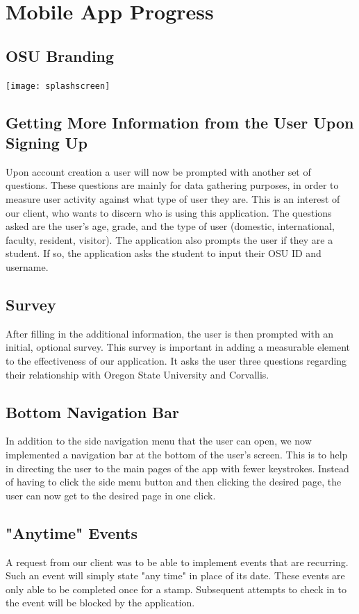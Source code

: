 \documentclass[onecolumn, draftclsnofoot,10pt, compsoc]{IEEEtran}
\begin{document}
\section{Mobile App Progress}
  \subsection{OSU Branding}
    \texttt{[image: splashscreen]}

  \subsection{Getting More Information from the User Upon Signing Up}
  Upon account creation a user will now be prompted with another set of questions. These questions are mainly for data gathering purposes,
  in order to measure user activity against what type of user they are. This is an interest of our client, who wants to discern who is using this application.
  The questions asked are the user's age, grade, and the type of user (domestic, international, faculty, resident, visitor). The application also prompts
  the user if they are a student. If so, the application asks the student to input their OSU ID and username.

  \subsection{Survey}
  After filling in the additional information, the user is then prompted with an initial, optional survey. This survey is important in adding a measurable element
  to the effectiveness of our application. It asks the user three questions regarding their relationship with Oregon State University and Corvallis.

  \subsection{Bottom Navigation Bar}
  In addition to the side navigation menu that the user can open, we now implemented a navigation bar at the bottom of the user's screen. This is to help in directing
  the user to the main pages of the app with fewer keystrokes. Instead of having to click the side menu button and then clicking the desired page, the user can now
  get to the desired page in one click.

  \subsection{"Anytime" Events}
  A request from our client was to be able to implement events that are recurring. Such an event will simply state "any time" in place of its date. These events are only
  able to be completed once for a stamp. Subsequent attempts to check in to the event will be blocked by the application.
\end{document}
